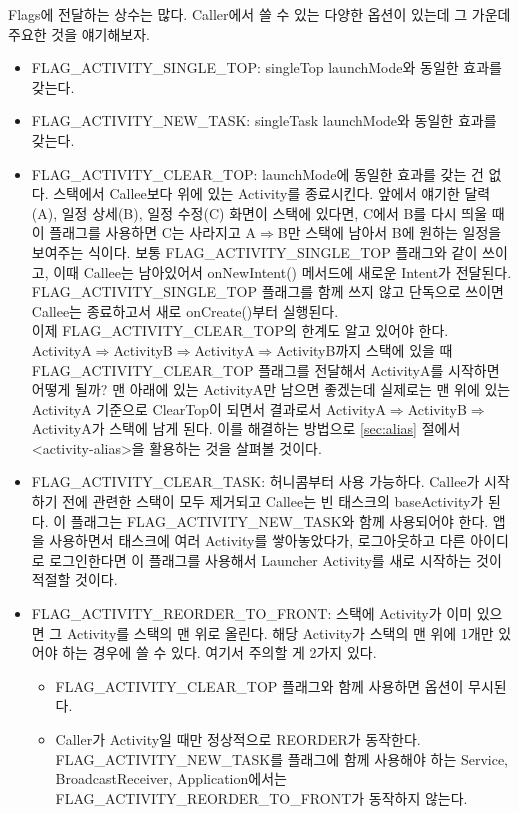 Flags에 전달하는 상수는 많다. Caller에서 쓸 수 있는 다양한 옵션이 있는데 그 가운데 주요한 것을 얘기해보자.
\begin{itemize}
\item FLAG\_ACTIVITY\_SINGLE\_TOP: singleTop launchMode와 동일한 효과를 갖는다.

\item FLAG\_ACTIVITY\_NEW\_TASK: singleTask launchMode와 동일한 효과를 갖는다.

\item FLAG\_ACTIVITY\_CLEAR\_TOP: launchMode에 동일한 효과를 갖는 건 없다. 스택에서 Callee보다 위에 있는 Activity를 종료시킨다. 
앞에서 얘기한 달력(A), 일정 상세(B), 일정 수정(C) 화면이 스택에 있다면, C에서 B를 다시 띄울 때 이 플래그를 사용하면 C는 사라지고 A$\Rightarrow$B만 스택에 남아서 B에 원하는 일정을 보여주는 식이다. 
보통 FLAG\_ACTIVITY\_SINGLE\_TOP 플래그와 같이 쓰이고, 이때 Callee는 남아있어서 onNewIntent() 메서드에 새로운 Intent가 전달된다. 
FLAG\_ACTIVITY\_SINGLE\_TOP 플래그를 함께 쓰지 않고 단독으로 쓰이면 Callee는 종료하고서 새로 onCreate()부터 실행된다.\\

이제 FLAG\_ACTIVITY\_CLEAR\_TOP의 한계도 알고 있어야 한다. ActivityA$\Rightarrow$Activity\-B$\Rightarrow$Activi\-tyA$\Rightarrow$ActivityB까지 스택에 있을 때 FLAG\_ACTI\-VITY\_CLEAR\_TOP 플래그를 전달해서 ActivityA를 시작하면 어떻게 될까? 
맨 아래에 있는 ActivityA만 남으면 좋겠는데 실제로는 맨 위에 있는 ActivityA 기준으로 ClearTop이 되면서 결과로서 ActivityA$\Rightarrow$ActivityB$\Rightarrow$ActivityA가 스택에 남게 된다. 
이를 해결하는 방법으로 \ref{sec:alias} 절에서 <activity-alias>을 활용하는 것을 살펴볼 것이다. 

\item FLAG\_ACTIVITY\_CLEAR\_TASK: 허니콤부터 사용 가능하다. Callee가 시작하기 전에 관련한 스택이 모두 제거되고 Callee는 빈 태스크의 baseActivity가 된다. 이 플래그는 FLAG\_ACTIVITY\_NEW\-\_TASK와 함께 사용되어야 한다. 
앱을 사용하면서 태스크에 여러 Activity를 쌓아놓았다가, 로그아웃하고 다른 아이디로 로그인한다면 이 플래그를 사용해서 Launcher Activity를 새로 시작하는 것이 적절할 것이다.

\item FLAG\_ACTIVITY\_REORDER\_TO\_FRONT: 스택에 Activity가 이미 있으면 그 Activity를 스택의 맨 위로 올린다. 해당 Activity가 스택의 맨 위에 1개만 있어야 하는 경우에 쓸 수 있다.
여기서 주의할 게 2가지 있다. 
\begin{itemize}
\item FLAG\_ACTIVITY\_CLEAR\_TOP 플래그와 함께 사용하면 옵션이 무시된다. 
\item Caller가 Activity일 때만 정상적으로 REORDER가 동작한다. FLAG\_ACTIVITY\_N\-EW\_TASK를 플래그에 함께 사용해야 하는 Service, BroadcastReceiver, Application에서는 FLAG\_ACTIVI\-TY\_RE\-ORDER\_TO\_FRONT가 동작하지 않는다.
\end{itemize}
\end{itemize}

